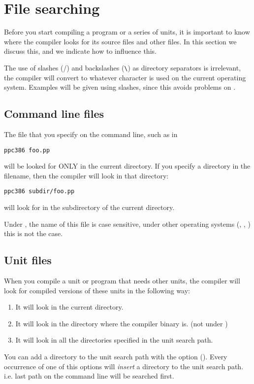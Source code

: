 \documentclass{report}
\begin{document}
\section{File searching}
Before you start compiling a program or a series of units, it is
important to know where the compiler looks for its source files and other
files. In this section we discuss this, and we indicate how to influence
this.

\begin{remark}
The use of slashes (/) and backslashes (\verb+\+) as directory separators
is irrelevant, the compiler will convert to whatever character is used on
the current operating system. Examples will be given using slashes, since
this avoids problems on \linux.
\end{remark}

\subsection{Command line files}
The file that you specify on the command line, such as in
\begin{verbatim}
ppc386 foo.pp
\end{verbatim}
will be looked for ONLY in the current directory. If you specify a directory
in the filename, then the compiler will look in that directory:
\begin{verbatim}
ppc386 subdir/foo.pp
\end{verbatim}
will look for  in the subdirectory  of the current
directory.

Under \linux, the name of this file is case sensitive, under other operating
systems (\dos, \windowsnt, \ostwo) this is not the case.

\subsection{Unit files}

When you compile a unit or program that needs other units, the compiler will
look for compiled versions of these units in the following way:
\begin{enumerate}
\item It will look in the current directory.
\item It will look in the directory where the compiler binary is.
(not under \linux)
\item It will look in all the directories specified in the unit search path.
\end{enumerate}
You can add a directory to the unit search path with the  option
(). Every occurrence of one of this options will {\em insert}
a directory to the unit search path. i.e. last path on the command line
will be searched first.
\end{document}
